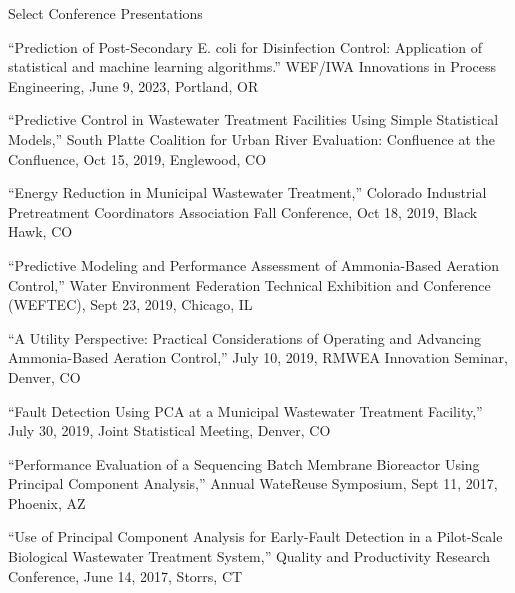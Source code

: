 \documentclass{resume} %
\begin{document}

\begin{rSection}{Select Conference Presentations}

``Prediction of Post-Secondary E. coli for Disinfection Control: Application of statistical and machine learning algorithms.'' WEF/IWA Innovations in Process Engineering, June 9, 2023, Portland, OR

``Predictive Control in Wastewater Treatment Facilities Using Simple Statistical Models,'' South Platte Coalition for Urban River Evaluation: Confluence at the Confluence, Oct 15, 2019, Englewood, CO

``Energy Reduction in Municipal Wastewater Treatment,'' Colorado Industrial Pretreatment Coordinators Association Fall Conference, Oct 18, 2019, Black Hawk, CO

%
``Predictive Modeling and Performance Assessment of Ammonia-Based Aeration Control,'' Water Environment Federation Technical Exhibition and Conference (WEFTEC), Sept 23, 2019, Chicago, IL

``A Utility Perspective: Practical Considerations of Operating and Advancing Ammonia-Based Aeration Control,'' July 10, 2019, RMWEA Innovation Seminar, Denver, CO

``Fault Detection Using PCA at a Municipal Wastewater Treatment Facility,'' July 30, 2019, Joint Statistical Meeting, Denver, CO

%
%
%
%
“Performance Evaluation of a Sequencing Batch Membrane Bioreactor Using Principal Component Analysis,” Annual WateReuse Symposium, Sept 11, 2017, Phoenix, AZ

“Use of Principal Component Analysis for Early-Fault Detection in a Pilot-Scale Biological Wastewater Treatment System,” Quality and Productivity Research Conference, June 14, 2017, Storrs, CT

%
%
\end{rSection}
\end{document}
